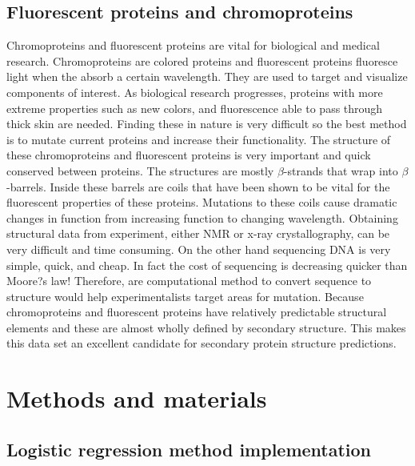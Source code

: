 \documentclass{article}
\begin{document}
\subsection{Fluorescent proteins and chromoproteins}
Chromoproteins and fluorescent proteins are vital for biological and medical research. Chromoproteins are colored proteins and fluorescent proteins fluoresce light when the absorb a certain wavelength. They are used to target and visualize components of interest. As biological research progresses, proteins with more extreme properties such as new colors, and fluorescence able to pass through thick skin are needed. Finding these in nature is very difficult so the best method is to mutate current proteins and increase their functionality. The structure of these chromoproteins and fluorescent proteins is very important and quick conserved between proteins. The structures are mostly $\beta$-strands that wrap into $\beta$-barrels. Inside these barrels are coils that have been shown to be vital for the fluorescent properties of these proteins. Mutations to these coils cause dramatic changes in function from increasing function to changing wavelength. Obtaining structural data from experiment, either NMR or x-ray crystallography, can be very difficult and time consuming. On the other hand sequencing DNA is very simple, quick, and cheap. In fact the cost of sequencing is decreasing quicker than Moore?s law! Therefore, are computational method to convert sequence to structure would help experimentalists target areas for mutation. Because chromoproteins and fluorescent proteins have relatively predictable structural elements and these are almost wholly defined by secondary structure. This makes this data set an excellent candidate for secondary protein structure predictions.


\section{Methods and materials}

\subsection{Logistic regression method implementation}
\end{document}
